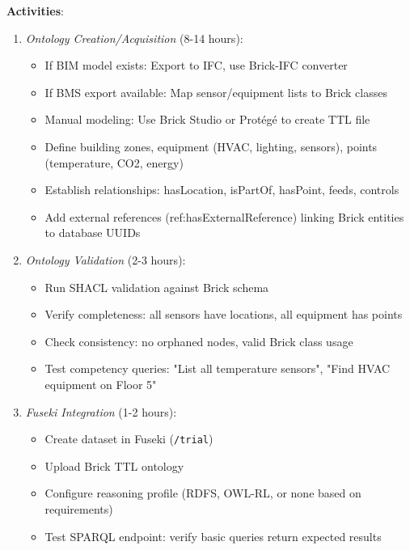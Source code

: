 \documentclass[acmlarge]{acmart}
\begin{document}
\textbf{Activities}:
\begin{enumerate}
    \item \textit{Ontology Creation/Acquisition} (8-14 hours):
    \begin{itemize}
        \item If BIM model exists: Export to IFC, use Brick-IFC converter
        \item If BMS export available: Map sensor/equipment lists to Brick classes
        \item Manual modeling: Use Brick Studio or Protégé to create TTL file
        \item Define building zones, equipment (HVAC, lighting, sensors), points (temperature, CO2, energy)
        \item Establish relationships: hasLocation, isPartOf, hasPoint, feeds, controls
        \item Add external references (ref:hasExternalReference) linking Brick entities to database UUIDs
    \end{itemize}
    
    \item \textit{Ontology Validation} (2-3 hours):
    \begin{itemize}
        \item Run SHACL validation against Brick schema
        \item Verify completeness: all sensors have locations, all equipment has points
        \item Check consistency: no orphaned nodes, valid Brick class usage
        \item Test competency queries: "List all temperature sensors", "Find HVAC equipment on Floor 5"
    \end{itemize}
    
    \item \textit{Fuseki Integration} (1-2 hours):
    \begin{itemize}
        \item Create dataset in Fuseki (\texttt{/trial})
        \item Upload Brick TTL ontology
        \item Configure reasoning profile (RDFS, OWL-RL, or none based on requirements)
        \item Test SPARQL endpoint: verify basic queries return expected results
    \end{itemize}
    

\end{enumerate}
\end{document}
